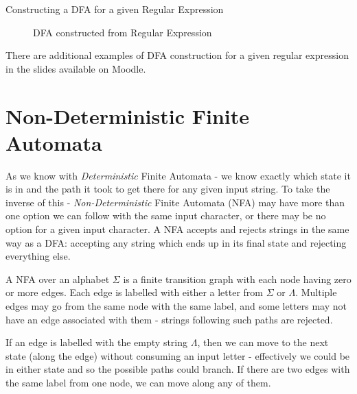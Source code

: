 \begin{example}{Constructing a DFA for a given Regular Expression}
\begin{figure}[H]
    \caption{DFA constructed from Regular Expression}
    \label{fig:eg-dfa-constructfromregex}
\end{figure}

\end{example}

\begin{extlink}
There are additional examples of DFA construction for a given regular expression in the slides available on Moodle.
\end{extlink}

\section{Non-Deterministic Finite Automata}
As we know with \textit{Deterministic} Finite Automata - we know exactly which state it is in and the path it took to get there for any given input string. To take the inverse of this - \textit{Non-Deterministic} Finite Automata (NFA) may have more than one option we can follow with the same input character, or there may be no option for a given input character. A NFA accepts and rejects strings in the same way as a DFA: accepting any string which ends up in its final state and rejecting everything else. 

A NFA over an alphabet $\Sigma$ is a finite transition graph with each node having zero or more edges. Each edge is labelled with either a letter from $\Sigma$ or $\Lambda$. Multiple edges may go from the same node with the same label, and some letters may not have an edge associated with them - strings following such paths are rejected. 

If an edge is labelled with the empty string $\Lambda$, then we can move to the next state (along the edge) without consuming an input letter - effectively we could be in either state and so the possible paths could branch. If there are two edges with the same label from one node, we can move along any of them.

